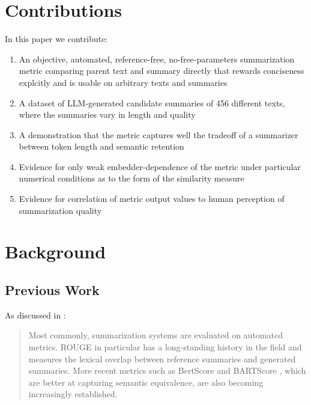 \documentclass{article}
\begin{document}
\section{Contributions}

In this paper we contribute:

\begin{enumerate}
	\item An objective, automated, reference-free, no-free-parameters summarization metric comparing parent text and summary directly that rewards conciseness explcitly and is usable on arbitrary texts and summaries
	\item A dataset of LLM-generated candidate summaries of 456 different texts, where the summaries vary in length and quality
	\item A demonstration that the metric captures well the tradeoff of a summarizer between token length and semantic retention
	\item Evidence for only weak embedder-dependence of the metric under particular numerical conditions as to the form of the similarity measure
	\item Evidence for correlation of metric output values to human perception of summarization quality	
\end{enumerate}

\section{Background}

\subsection{Previous Work}
As discussed in \citep{2023arXiv230504853R}:

\begin{quote}
Most commonly, summarization systems are evaluated on automated metrics. ROUGE \citep{lin_rouge_2004} in particular has a long-standing history in the field and measures the lexical overlap between reference summaries and generated summaries. More recent metrics such as BertScore \citep{zhang_bertscore_2019} and BARTScore \citep{yuan_bartscore_2021}, which are better at capturing semantic equivalence, are also becoming increasingly established. 
\end{quote}
\end{document}
